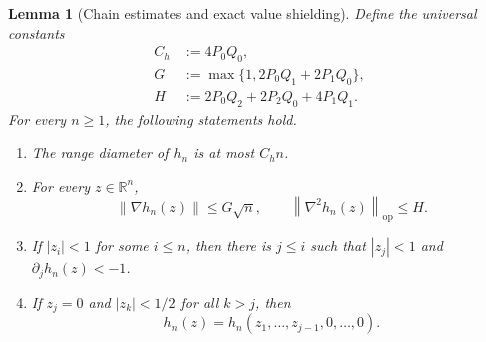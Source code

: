 \documentclass[11pt]{article}
\numberwithin{equation}{section}
\newtheorem{lemma}[lemma]{Lemma}
\theoremstyle{definition}
\theoremstyle{remark}
\newcommand{\R}{\mathbb{R}}
\newcommand{\norm}[1]{\left\lVert #1\right\rVert}
\begin{document}
\begin{lemma}[Chain estimates and exact value shielding]
\label{lem:chain}
Define the universal constants
\begin{equation}
\begin{split}
    C_h&:=4P_0Q_0,\\
    G&:=\max\{1,2P_0Q_1+2P_1Q_0\},\\
    H&:=2P_0Q_2+2P_2Q_0+4P_1Q_1.
\end{split}
\label{eq:chain-constants}
\end{equation}
For every $n\geq1$, the following statements hold.
\begin{enumerate}[label=(\roman*)]
\item The range diameter of $h_n$ is at most $C_hn$.
\item For every $z\in\R^n$,
\begin{equation}
    \norm{\nabla h_n(z)}\leq G\sqrt n,
    \qquad \norm{\nabla^2h_n(z)}_{\mathrm{op}}\leq H.
    \label{eq:chain-bounds}
\end{equation}
\item If $|z_i|<1$ for some $i\leq n$, then there is $j\leq i$ such that
$|z_j|<1$ and $\partial_jh_n(z)<-1$.
\item If $z_j=0$ and $|z_k|<1/2$ for all $k>j$, then
\begin{equation}
    h_n(z)=h_n(z_1,\ldots,z_{j-1},0,\ldots,0).
    \label{eq:shield}
\end{equation}
\end{enumerate}
\end{lemma}
\end{document}
